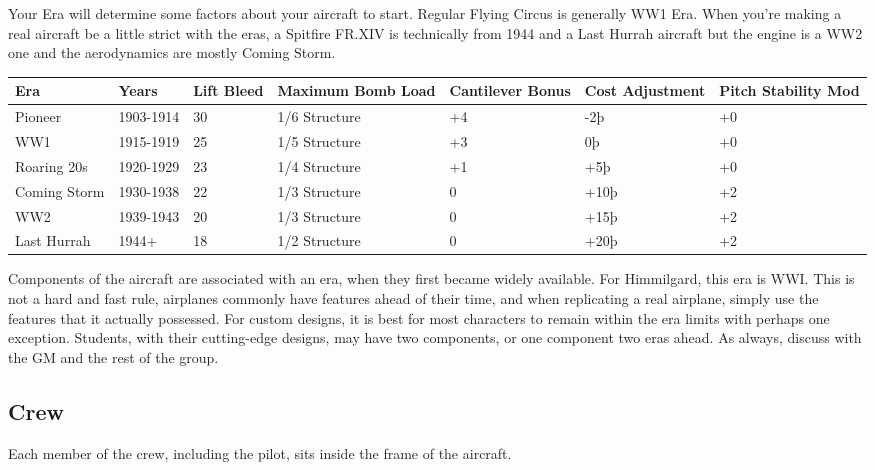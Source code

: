 \documentclass{article}
\begin{document}
Your Era will determine some factors about your aircraft to start.
Regular Flying Circus is generally WW1 Era. When you're making a real
aircraft be a little strict with the eras, a Spitfire FR.XIV is
technically from 1944 and a Last Hurrah aircraft but the engine is a WW2
one and the aerodynamics are mostly Coming Storm.

\begin{tabular}{|l|l|l|l|l|l|l|}
    \hline
    Era          & Years               & Lift Bleed & Maximum Bomb Load & Cantilever Bonus & Cost
    Adjustment   & Pitch Stability Mod                                                                 \\\hline
    Pioneer      & 1903-1914           & 30         & 1/6 Structure     & +4               & -2þ  & +0 \\\hline
    WW1          & 1915-1919           & 25         & 1/5 Structure     & +3               & 0þ   & +0 \\\hline
    Roaring 20s  & 1920-1929           & 23         & 1/4 Structure     & +1               & +5þ  & +0 \\\hline
    Coming Storm & 1930-1938           & 22         & 1/3 Structure     & 0                & +10þ & +2 \\\hline
    WW2          & 1939-1943           & 20         & 1/3 Structure     & 0                & +15þ & +2 \\\hline
    Last Hurrah  & 1944+               & 18         & 1/2 Structure     & 0                & +20þ & +2 \\\hline
\end{tabular}

Components of the aircraft are associated with an era, when they
first became widely available. For Himmilgard, this era is WWI. This is
not a hard and fast rule, airplanes commonly have features ahead of
their time, and when replicating a real airplane, simply use the
features that it actually possessed. For custom designs, it is best for
most characters to remain within the era limits with perhaps one
exception. Students, with their cutting-edge designs, may have two
components, or one component two eras ahead. As always, discuss with the
GM and the rest of the group.

\subsection{Crew}
\label{_Crew}

Each member of the crew, including the pilot, sits inside the frame of
the aircraft.
\end{document}
